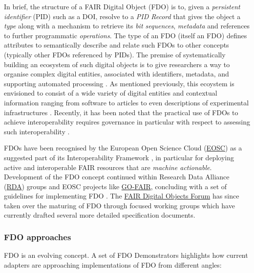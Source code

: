 \documentclass[fleqn,10pt,lineno]{wlpeerjlua}
\begin{document}
In brief, the structure of a FAIR Digital Object (FDO) is to, given a \emph{persistent identifier} (PID) such as a DOI, resolve to a \emph{PID Record} that gives the object a \emph{type} along with a mechanism to retrieve its \emph{bit sequences}, \emph{metadata} and references to further programmatic \emph{operations}. The type of an FDO (itself an FDO) defines attributes to semantically describe and relate such FDOs to other concepts (typically other FDOs referenced by PIDs). The premise of systematically building an ecosystem of such digital objects is to give researchers a way to organise complex digital entities, associated with identifiers, metadata, and supporting automated processing \autocite{wittenburgDigitalObjectsDrivers2019a}. As mentioned previously, this ecoystem is envisioned to consist of a wide variety of digital entities and contextual information ranging from software to articles to even descriptions of experimental infrastructures \autocite{Azeroual2022PuttingFP}. Recently, it has been noted that the practical use of FDOs to achieve interoperability requires governance in particular with respect to assessing such interoperability \autocite{Wilkinson2023}. 

FDOs have been recognised by the European Open Science Cloud (\href{https://eosc.eu/}{EOSC}) as a suggested part of its Interoperability Framework \autocite{corchoEOSCInteroperabilityFramework2021b}, in particular for deploying active and interoperable FAIR resources that are \emph{machine actionable}. Development of the FDO concept continued within Research Data Alliance (\href{https://www.rd-alliance.org/}{RDA}) groups and EOSC projects like \href{https://www.go-fair.org/}{GO-FAIR}, concluding with a set of guidelines for implementing FDO \autocite{boninoFAIRDigitalObject}. The \href{https://fairdo.org/}{FAIR Digital Objects Forum} has since taken over the maturing of FDO through focused working groups which have currently drafted several more detailed specification documents.

\subsubsection*{FDO approaches}\label{sec:fdo-approaches}

FDO is an evolving concept. A set of FDO Demonstrators \autocite{wittenburgFAIRDigitalObject2022b} highlights how current adapters are approaching implementations of FDO from different angles:
\end{document}
